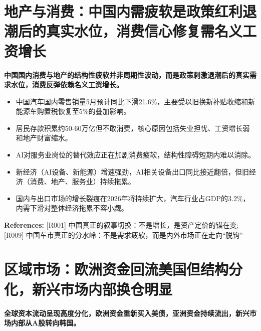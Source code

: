\documentclass[11pt]{ctexart}
\begin{document}
\section{地产与消费：中国内需疲软是政策红利退潮后的真实水位，消费信心修复需名义工资增长}
\textbf{中国国内消费与地产的结构性疲软并非周期性波动，而是政策刺激退潮后的真实需求水位，消费反弹依赖名义工资增长。}

\begin{itemize}
  \item 中国汽车国内零售销量5月预计同比下滑21.6\%，主要受以旧换新补贴收缩和新能源车购置税恢复至5\%的叠加影响。
  \item 居民存款积累约50-60万亿但不敢消费，核心原因包括失业担忧、工资增长弱和地产财富缩水。
  \item AI对服务业岗位的替代效应正在加剧消费疲软，结构性障碍短期内难以消除。
  \item 新经济（AI设备、新能源）增速强劲，AI相关设备出口同比接近翻倍，但旧经济（消费、地产、服务业）持续拖累。
  \item 国内与出口市场的增长裂痕在2026年将持续扩大，汽车行业占GDP的3.2\%，内需下滑对整体经济拖累不容小觑。
\end{itemize}
{\small\color{refgray}\textbf{References:} [R001] 中国真正的叙事切换：不是增长，是资产定价的锚在变; [R009] 中国车市真正的分水岭：不是需求疲软，而是内外市场正在走向“脱钩”}

\section{区域市场：欧洲资金回流美国但结构分化，新兴市场内部换仓明显}
\textbf{全球资本流动呈现高度分化，欧洲资金重新买入美债，亚洲资金持续流出，新兴市场内部从A股转向韩国。}
\end{document}
